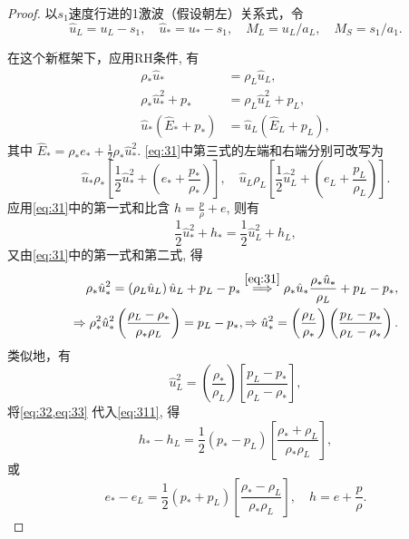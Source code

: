 \documentclass[12pt]{article}
\begin{document}
\begin{proof}

	以$s_1$速度行进的1激波（假设朝左）关系式，令
	\begin{equation}
		\hat{u}_{L}=u_{L}-s_{1}, \quad \hat{u}_{*}=u_{*}-s_{1}, \quad M_{L}=u_{L} / a_{L}, \quad M_{S}=s_{1} / a_{1}.
	\end{equation}

	在这个新框架下，应用RH条件, 有
	\begin{equation}
		\begin{aligned}
			\rho_{*} \hat{u}_{*}                      & =\rho_{L} \hat{u}_{L},                      \\
			\rho_{*} \hat{u}_{*}^{2}+p_{*}            & =\rho_{L} \hat{u}_{L}^{2}+p_{L},            \\
			\hat{u}_{*}\left(\hat{E}_{*}+p_{*}\right) & =\hat{u}_{L}\left(\hat{E}_{L}+p_{L}\right),
		\end{aligned}
		\label{eq:31}
	\end{equation}
	其中 $\hat{E}_{*}=\rho_{*} e_{*}+\frac{1}{2} \rho_{*} \hat{u}_{*}^{2} .$
	\cref{eq:31}中第三式的左端和右端分别可改写为
	\begin{equation}
		\hat{u}_{*} \rho_{*}\left[\frac{1}{2} \hat{u}_{*}^{2}+\left(e_{*}+\frac{p_{*}}{\rho_{*}}\right)\right], \quad \hat{u}_{L} \rho_{L}\left[\frac{1}{2} \hat{u}_{L}^{2}+\left(e_{L}+\frac{p_{L}}{\rho_{L}}\right)\right].
	\end{equation}
	应用\cref{eq:31}中的第一式和比含 $h=\frac{p}{\rho}+e$, 则有
	\begin{equation}
		\frac{1}{2} \hat{u}_{*}^{2}+h_{*}=\frac{1}{2} \hat{u}_{L}^{2}+h_{L},
		\label{eq:311}
	\end{equation}
	又由\cref{eq:31}中的第一式和第二式, 得
	\begin{equation}
		\begin{aligned}
			\rho_{*} \hat{u}_{*}^{2}=\left(\rho_{L} \hat{u}_{L}\right) \hat{u}_{L}+p_{L}-p_{*} \stackrel{\cref{eq:31}}{\implies } \rho_{*} \hat{u}_{*} \frac{\rho_{*} \hat{u}_{*}}{\rho_{L}}+p_{L}-p_{*}, \\
			\Rightarrow \rho_{*}^{2} \hat{u}_{*}^{2}\left(\frac{\rho_{L}-\rho_{*}}{\rho_{*} \rho_{L}}\right)=p_{L}-p_{*}, \Rightarrow \hat{u}_{*}^{2}=\left(\frac{\rho_{L}}{\rho_{*}}\right)\left(\frac{p_{L}-p_{*}}{\rho_{L}-\rho_{*}}\right) .
		\end{aligned}
		\label{eq:32}
	\end{equation}
	类似地，有
	\begin{equation}
		\hat{u}_{L}^{2}=\left(\frac{\rho_{*}}{\rho_{L}}\right)\left[\frac{p_{L}-p_{*}}{\rho_{L}-\rho_{*}}\right],
		\label{eq:33}
	\end{equation}
	将\cref{eq:32,eq:33} 代入\cref{eq:311}, 得
	\begin{equation}
		h_{*}-h_{L}=\frac{1}{2}\left(p_{*}-p_{L}\right)\left[\frac{\rho_{*}+\rho_{L}}{\rho_{*} \rho_{L}}\right],
	\end{equation}
	或
	\begin{equation}
		e_{*}-e_{L}=\frac{1}{2}\left(p_{*}+p_{L}\right)\left[\frac{\rho_{*}-\rho_{L}}{\rho_{*} \rho_{L}}\right], \quad h=e+\frac{p}{\rho}.
		\label{eq:34}
	\end{equation}


\end{proof}
\end{document}
